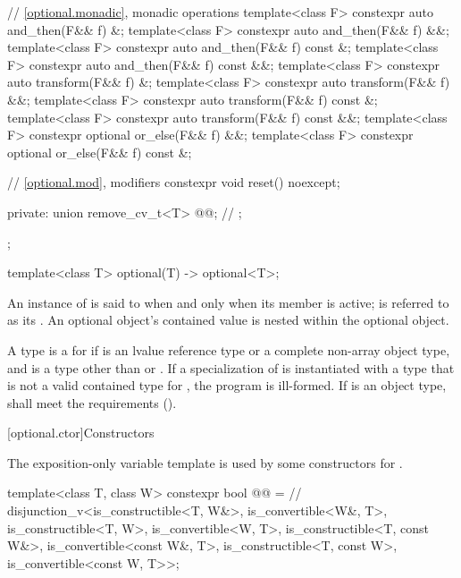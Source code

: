 \begin{codeblock}
{{    // \ref{optional.monadic}, monadic operations
    template<class F> constexpr auto and_then(F&& f) &;
    template<class F> constexpr auto and_then(F&& f) &&;
    template<class F> constexpr auto and_then(F&& f) const &;
    template<class F> constexpr auto and_then(F&& f) const &&;
    template<class F> constexpr auto transform(F&& f) &;
    template<class F> constexpr auto transform(F&& f) &&;
    template<class F> constexpr auto transform(F&& f) const &;
    template<class F> constexpr auto transform(F&& f) const &&;
    template<class F> constexpr optional or_else(F&& f) &&;
    template<class F> constexpr optional or_else(F&& f) const &;

    // \ref{optional.mod}, modifiers
    constexpr void reset() noexcept;

  private:
    union {
      remove_cv_t<T> @@;       // \expos
    };
  };

  template<class T>
    optional(T) -> optional<T>;
}
\end{codeblock}

\pnum
An instance of  is said to
when and only when
its member  is active;
 is referred to as its
.
An optional object's contained value
is nested within the optional object.

\pnum
A type  is a
 for 
if  is an lvalue reference type or a complete non-array object type,
and  is a type other than  or .
If a specialization of  is instantiated with a type 
that is not a valid contained type for , the program is ill-formed.
If  is an object type,
 shall meet the  requirements ().

[optional.ctor]{Constructors}

\pnum
The exposition-only variable template 
is used by some constructors for .
\begin{codeblock}
template<class T, class W>
constexpr bool @@ =  // \expos
  disjunction_v<is_constructible<T, W&>, is_convertible<W&, T>,
                is_constructible<T, W>, is_convertible<W, T>,
                is_constructible<T, const W&>, is_convertible<const W&, T>,
                is_constructible<T, const W>, is_convertible<const W, T>>;
\end{codeblock}

